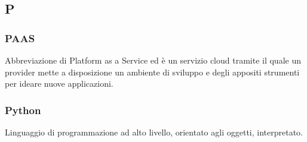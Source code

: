 \subsection*{\textbf{\hfill \Huge{P} \hfill}} 
\subsubsection*{PAAS}
Abbreviazione di Platform as a Service ed è un servizio cloud tramite il quale un provider mette a disposizione un ambiente di sviluppo e degli appositi strumenti per ideare nuove applicazioni.
\subsubsection*{Python}
Linguaggio di programmazione ad alto livello, orientato agli oggetti, interpretato.